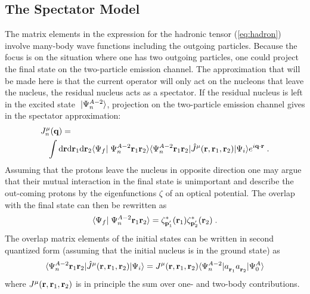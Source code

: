 \subsection{The Spectator Model}
The matrix elements in the expression for the hadronic tensor (\ref{eq:hadron})
involve many-body  wave functions including the outgoing particles. Because the
focus is on the situation where one has two 
outgoing particles, one could project the final state on the 
two-particle emission channel.
The approximation that will be made here is that the current operator will only
act on the nucleons that leave the nucleus, the residual nucleus acts as
a spectator.
If the residual nucleus
is left in the excited state $\;| \Psi^{A-2}_n \rangle$, projection on the 
two-particle emission channel gives in the spectator approximation:
%
	\begin{eqnarray}
	\lefteqn{
		J_n^\mu(\rvec{q})
	=} &&
	\\
	&&
		\int
		{\rm d} \rvec{r}
		{\rm d} \rvec{r}_1
		{\rm d} \rvec{r}_2
		\inp< \Psi_f | \Psi^{A-2}_n \rvec{r}_1 \rvec{r}_2 >
		\ME< \Psi^{A-2}_n \rvec{r}_1 \rvec{r}_2 | 
                   \hat{J}^\mu( \rvec{r}, \rvec{r}_1,\rvec{r}_2)
		| \Psi_i >
		e^{i \rvec{q}\cdot\rvec{r}}
	\;.
	\nonumber
	\end{eqnarray}
%
Assuming that the protons leave the nucleus in opposite direction one may
argue that their mutual interaction in the final state is unimportant 
and describe the out-coming protons by the 
eigenfunctions $\zeta$ of an optical potential.
The overlap with the final state can then be rewritten as
%
	\begin{equation}
		\inp< \Psi_f | \Psi^{A-2}_n \rvec{r}_1 \rvec{r}_2 >
	=	
		\zeta_{\rvec{p}'_1}^\ast (\rvec{r}_1) 
		\zeta_{\rvec{p}'_2}^\ast (\rvec{r}_2) 
	\label{eq:finalst}
	\;.
	\end{equation}
%
The overlap matrix elements of the initial states can be written in
second quantized form (assuming that the initial nucleus is in the ground
state) as
%
	\begin{equation}
		\ME< \Psi^{A-2}_n \rvec{r}_1 \rvec{r}_2 | 
                   \hat{J}^\mu( \rvec{r}, \rvec{r}_1,\rvec{r}_2)
		| \Psi_i >
	=
               	J^\mu( \rvec{r}, \rvec{r}_1,\rvec{r}_2)
		\ME< \Psi^{A-2}_n | 
			\Oa{\rvec{r}_1}\Oa{\rvec{r}_2} 
		| \Psi^A_0 >
	\end{equation}
%
where $J^\mu( {\bf r}, {\bf r}_1,{\bf r}_2)$ is in principle the sum over 
one- and two-body contributions.
